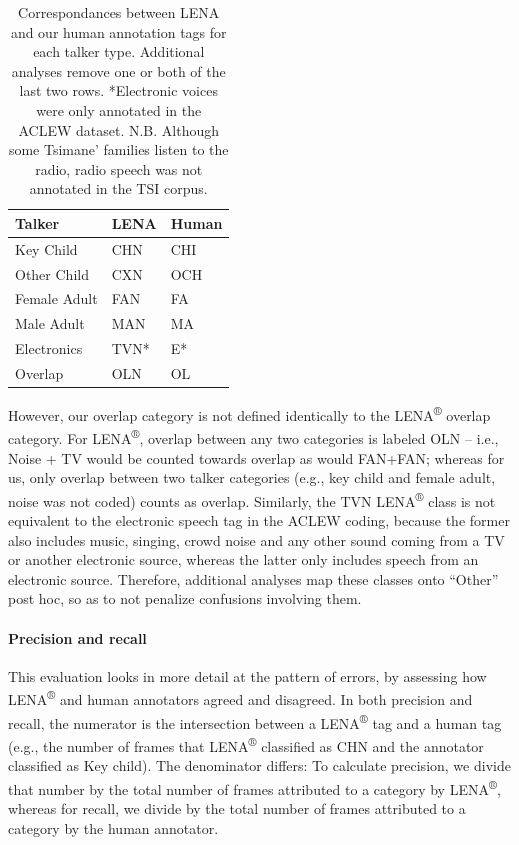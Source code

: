 \documentclass[english,table,man,floatsintext]{apa6}
\let\oldparagraph\paragraph
\renewcommand{\paragraph}[1]{\oldparagraph{#1}\mbox{}}
\begin{document}
\begin{table}

\caption{\label{tab:tab-tsicor}Correspondances between LENA and our human annotation tags for each talker type. Additional analyses remove one or both of the last two rows. *Electronic voices were only annotated in the ACLEW dataset. N.B. Although some Tsimane' families listen to the radio, radio speech was not annotated in the TSI corpus.}
\centering
\begin{tabular}[t]{>{\raggedright\arraybackslash}p{4cm}>{\raggedright\arraybackslash}p{2cm}>{\raggedright\arraybackslash}p{2cm}}
\toprule
Talker & LENA & Human\\
\midrule
Key Child & CHN & CHI\\
Other Child & CXN & OCH\\
Female Adult & FAN & FA\\
Male Adult & MAN & MA\\
Electronics & TVN* & E*\\
\addlinespace
Overlap & OLN & OL\\
\bottomrule
\end{tabular}
\end{table}

However, our overlap category is not defined identically to the LENA\textsuperscript{®} overlap category. For LENA\textsuperscript{®}, overlap between any two categories is labeled OLN -- i.e., Noise + TV would be counted towards overlap as would FAN+FAN; whereas for us, only overlap between two talker categories (e.g., key child and female adult, noise was not coded) counts as overlap. Similarly, the TVN LENA\textsuperscript{®} class is not equivalent to the electronic speech tag in the ACLEW coding, because the former also includes music, singing, crowd noise and any other sound coming from a TV or another electronic source, whereas the latter only includes speech from an electronic source. Therefore, additional analyses map these classes onto \enquote{Other} post hoc, so as to not penalize confusions involving them.

\hypertarget{precision-and-recall}{%
\paragraph{Precision and recall}\label{precision-and-recall}}

This evaluation looks in more detail at the pattern of errors, by assessing how LENA\textsuperscript{®} and human annotators agreed and disagreed. In both precision and recall, the numerator is the intersection between a LENA\textsuperscript{®} tag and a human tag (e.g., the number of frames that LENA\textsuperscript{®} classified as CHN and the annotator classified as Key child). The denominator differs: To calculate precision, we divide that number by the total number of frames attributed to a category by LENA\textsuperscript{®}, whereas for recall, we divide by the total number of frames attributed to a category by the human annotator.
\end{document}
